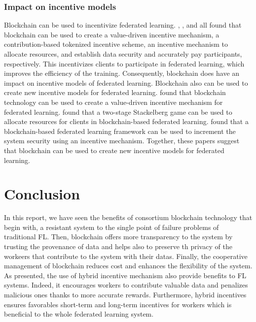 \documentclass{article}
\begin{document}
\subsubsection{Impact on incentive models}
Blockchain can be used to incentivize federated learning. \cite{kumar_2020}, \cite{pandey_2022}, \cite{wang_2022} and \cite{martinez_record_2019} all found that blockchain can be used to create a value-driven incentive mechanism, a contribution-based tokenized incentive scheme, an incentive mechanism to allocate resources, and establish data security and accurately pay participants, respectively. This incentivizes clients to participate in federated learning, which improves the efficiency of the training. Consequently, blockchain does have an impact on incentive models of federated learning.\newline
Blockchain also can be used to create new incentive models for federated learning. \cite{kumar_2020} found that blockchain technology can be used to create a value-driven incentive mechanism for federated learning. \cite{wang_2022} found that a two-stage Stackelberg game can be used to allocate resources for clients in blockchain-based federated learning. \cite{goncalves_2022} found that a blockchain-based federated learning framework can be used to increment the system security using an incentive mechanism. Together, these papers suggest that blockchain can be used to create new incentive models for federated learning.

\section{Conclusion}
In this report, we have seen the benefits of consortium blockchain technology that begin with, a resistant system to the single point of failure problems of traditional FL. Then, blockchain offers more transparency to the system by trusting the provenance of data and helps also to preserve th privacy of the workeers that contribute to the system with their datas. Finally, the cooperative management of blockchain reduces cost and enhances the flexibility of the system. As presented, the use of hybrid incentive mechanism also provide benefits to FL systems. Indeed, it encourages workers to contribute valuable data and penalizes malicious ones thanks to more accurate rewards. Furthermore, hybrid incentives ensures favorables short-term and long-term incentives for workers which is beneficial to the whole federated learning system.
\end{document}
